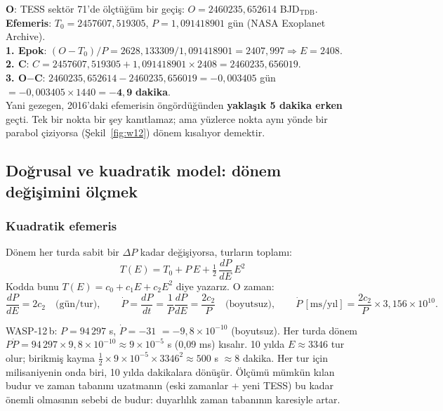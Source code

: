 \begin{ornek}
\textbf{O}: TESS sektör 71'de ölçtüğüm bir geçiş: $O = 2460235{,}652614$ BJD$_\mathrm{TDB}$.\\
\textbf{Efemeris}: $T_0 = 2457607{,}519305$, $P = 1{,}091418901$ gün (NASA Exoplanet Archive).\\
\textbf{1. Epok}: $(O - T_0)/P = 2628{,}133309 / 1{,}091418901 = 2407{,}997 \Rightarrow E = 2408$.\\
\textbf{2. C}: $C = 2457607{,}519305 + 1{,}091418901 \times 2408 = 2460235{,}656019$.\\
\textbf{3. O$-$C}: $2460235{,}652614 - 2460235{,}656019 = -0{,}003405$ gün $= -0{,}003405 \times 1440 = \mathbf{-4{,}9}$
\textbf{dakika}.\\
Yani gezegen, 2016'daki efemerisin öngördüğünden \textbf{yaklaşık 5 dakika erken} geçti. Tek bir nokta bir şey
kanıtlamaz; ama yüzlerce nokta aynı yönde bir parabol çiziyorsa (Şekil~\ref{fig:w12}) dönem kısalıyor demektir.
\end{ornek}

\subsection{Doğrusal ve kuadratik model: dönem değişimini ölçmek}

\subsubsection*{Kuadratik efemeris}
Dönem her turda sabit bir $\Delta P$ kadar değişiyorsa, turların toplamı:
\[
\boxed{\;T(E) = T_0 + P\,E + \tfrac{1}{2}\,\frac{dP}{dE}\,E^2\;}
\]
Kodda bunu $T(E) = c_0 + c_1 E + c_2 E^2$ diye yazarız. O zaman:
\[
\frac{dP}{dE} = 2c_2 \quad\text{(gün/tur)}, \qquad
\dot P = \frac{dP}{dt} = \frac{1}{P}\frac{dP}{dE} = \frac{2c_2}{P} \quad\text{(boyutsuz)}, \qquad
\dot P\,[\mathrm{ms/yıl}] = \frac{2c_2}{P}\times 3{,}156\times10^{10}.
\]

\begin{ornek}
WASP-12\,b: $P = 94\,297$ s, $\dot P = -31$\msyil{} $= -9{,}8\times10^{-10}$ (boyutsuz).
Her turda dönem $P\dot P = 94\,297 \times 9{,}8\times10^{-10} \approx 9\times10^{-5}$ s (0,09 ms) kısalır.
10 yılda $E \approx 3346$ tur olur; birikmiş kayma $\tfrac12 \times 9\times10^{-5} \times 3346^2 \approx 500$ s
$\approx 8$ dakika. Her tur için milisaniyenin onda biri, 10 yılda dakikalara dönüşür. Ölçümü mümkün kılan budur ve
zaman tabanını uzatmanın (eski zamanlar + yeni TESS) bu kadar önemli olmasının sebebi de budur: duyarlılık
zaman tabanının karesiyle artar.
\end{ornek}

